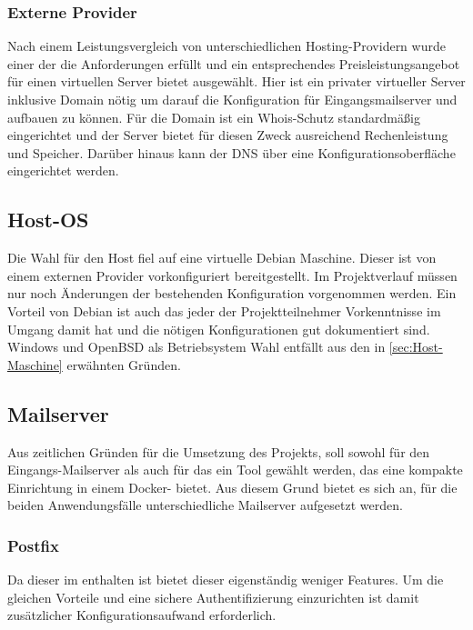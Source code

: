 \documentclass[a4paper,11pt,singlespacing]{article}
\begin{document}
		\subsubsection{Externe Provider}\label{sec:AuswahlLösungExterneProvider}
			Nach einem Leistungsvergleich von unterschiedlichen Hosting-Providern wurde einer der die Anforderungen erfüllt und ein entsprechendes Preisleistungsangebot für einen virtuellen Server bietet ausgewählt.
			Hier ist ein privater virtueller Server inklusive Domain nötig um darauf die Konfiguration für Eingangsmailserver und  aufbauen zu können.
			Für die Domain ist ein Whois-Schutz standardmäßig eingerichtet und der Server bietet für diesen Zweck ausreichend Rechenleistung und Speicher. Darüber hinaus kann der DNS über eine Konfigurationsoberfläche eingerichtet werden.
			
			

	\subsection{Host-OS}\label{sec:AuswahlLösungHost-Maschine}
			Die Wahl für den Host fiel auf eine virtuelle Debian Maschine.
			Dieser ist von einem externen Provider vorkonfiguriert  bereitgestellt. Im Projektverlauf müssen nur noch Änderungen der bestehenden Konfiguration vorgenommen werden. Ein Vorteil von Debian ist auch das jeder der Projektteilnehmer Vorkenntnisse im Umgang damit hat und die nötigen Konfigurationen gut dokumentiert sind.
Windows und OpenBSD als Betriebsystem Wahl entfällt aus den in \autoref{sec:Host-Maschine} erwähnten Gründen.

	\subsection{Mailserver}\label{sec:AuswahlLösungMailserver}
		Aus zeitlichen Gründen für die Umsetzung des Projekts, soll sowohl für den Eingangs-Mailserver als auch für das  ein Tool gewählt werden, das eine kompakte Einrichtung in einem Docker-	bietet. Aus diesem Grund bietet es sich an, für die beiden Anwendungsfälle unterschiedliche Mailserver aufgesetzt werden.
		
		\subsubsection{Postfix}\label{sec:AuswahlLösungPostfix}	
			Da dieser im  enthalten ist bietet dieser eigenständig weniger Features. Um die gleichen Vorteile und eine sichere Authentifizierung einzurichten ist damit zusätzlicher Konfigurationsaufwand erforderlich.
			
\end{document}
